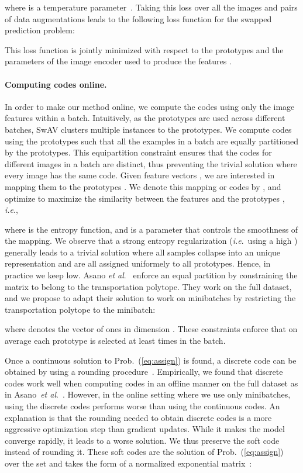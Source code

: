 \documentclass{article}
\def\onedot{.}
\def\ie{\emph{i.e}\onedot} \def\Ie{\emph{I.e}\onedot}
\def\etal{\emph{et al}\onedot}
\def\OURS{SwAV\xspace}
\begin{document}
where  is a temperature parameter~\cite{wu2018unsupervised}.
Taking this loss over all the images and pairs of data augmentations leads to the following loss function for the swapped prediction problem:

This loss function is jointly minimized with respect to the prototypes  and the parameters  of the image encoder  used to produce the features .

\paragraph{Computing codes online.}

In order to make our method online, we compute the codes using only the image features within a batch.
Intuitively, as the prototypes  are used across different batches, \OURS clusters multiple instances to the prototypes.
We compute codes using the prototypes  such that all the examples in a batch are equally partitioned by the prototypes. 
This equipartition constraint ensures that the codes for different images in a batch are distinct, thus preventing the trivial solution where every image has the same code.
Given  feature vectors , we are interested in mapping them to the prototypes .
We denote this mapping or codes by , and optimize  to maximize the similarity between the features and the prototypes , \ie, 

where  is the entropy function,  and  is a parameter that controls the smoothness of the mapping.
We observe that a strong entropy regularization (\ie~using a high ) generally leads to a trivial solution where all samples collapse into an unique representation and are all assigned uniformely to all prototypes.
Hence, in practice we keep  low.
Asano \etal~\cite{asano2019self}  enforce an equal partition by constraining the matrix  to belong to the transportation polytope.
They work on the full dataset, and we propose to adapt their solution to work on minibatches by restricting the transportation polytope to the minibatch:

where  denotes the vector of ones in dimension .
These constraints enforce that on average each prototype is selected at least  times in the batch.

Once a continuous solution  to Prob.~(\ref{eq:assign}) is found, a discrete code can be obtained by using a rounding procedure~\cite{asano2019self}.
Empirically, we found that discrete codes work well when computing codes in an offline manner on the full dataset as in Asano~\etal~\cite{asano2019self}.
However, in the online setting where we use only minibatches, using the discrete codes performs worse than using the continuous codes.
An explanation is that the rounding needed to obtain discrete codes is a more aggressive optimization step than gradient updates.
While it makes the model converge rapidly, it leads to a worse solution.
We thus preserve the soft code  instead of rounding it. 
These soft codes  are the solution of Prob.~(\ref{eq:assign}) over the set  and takes the form of a normalized exponential matrix~\cite{cuturi2013sinkhorn}:
\end{document}
